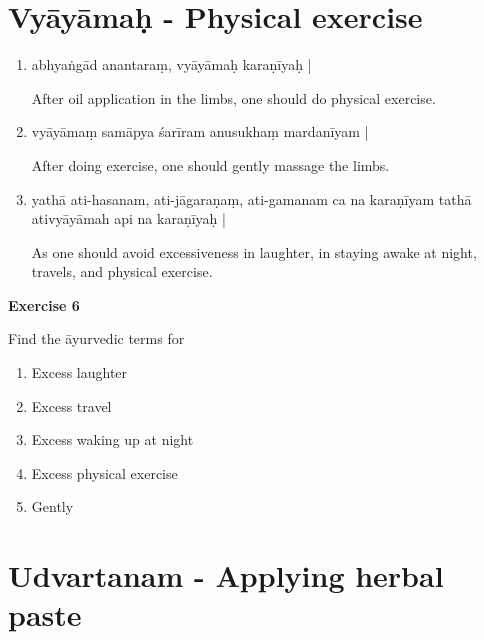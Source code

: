 \chapter{Vyāyāmaḥ - Physical exercise}

\begin{enumerate}
\item {}

abhyaṅgād anantaraṃ,  vyāyāmaḥ karaṇīyaḥ |

After oil application in the limbs, one should do physical exercise. 

\item {}

vyāyāmaṃ samāpya śarīram anusukhaṃ mardanīyam |

After doing exercise, one should gently massage the limbs. 

\item {}

yathā ati-hasanam, ati-jāgaraṇaṃ, ati-gamanam ca na karaṇīyam tathā ativyāyāmah api na karaṇīyaḥ |

As one should avoid excessiveness in laughter, in staying awake at night, travels, and physical exercise.
\end{enumerate}

\begin{center}
\textbf{\large Exercise  6}
\end{center}

Find the āyurvedic terms for

\begin{enumerate}
\renewcommand{\theenumi}{\alph{enumi}}
\renewcommand{\labelenumi}{\theenumi.}
\item Excess laughter
\item Excess travel
\item Excess waking up at night
\item Excess physical exercise
\item Gently
\end{enumerate}

\chapter{Udvartanam - Applying herbal paste}

